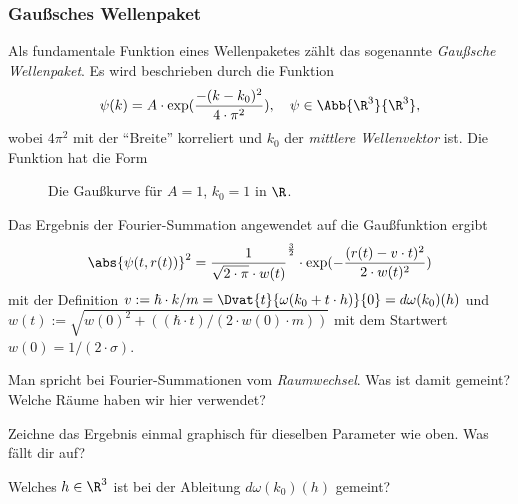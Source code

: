 \documentclass{subfiles}
\begin{document}

    \subsubsection*{Gaußsches Wellenpaket}
        Als fundamentale Funktion eines Wellenpaketes zählt das sogenannte \textit{Gaußsche Wellenpaket}. Es wird beschrieben durch die Funktion 
        \[\psi(k) = A\cdot\exp(\frac{-(k - k_0)^2}{4\cdot\pi^2}),\quad \psi\in\Abb{\R^3}{\R^3},\]
        wobei $4\pi^2$ mit der \enquote{Breite} korreliert und $k_0$ der \emph{mittlere Wellenvektor} ist. Die Funktion hat die Form
        \begin{figure}[H]
            \centering
            \caption{Die Gaußkurve für $A=1$, $k_0=1$ in $\R$.}
        \end{figure}
        Das Ergebnis der Fourier-Summation angewendet auf die Gaußfunktion ergibt 
        \[\abs{\psi(t,r(t))}^2 = \frac{1}{\sqrt{2\cdot\pi}\cdot w(t)}^{\frac{3}{2}}\cdot\exp(-\frac{(r(t)-v\cdot t)^2}{2\cdot w(t)^2})\]
        mit der Definition $v:=\hbar\cdot k/m = \Dvat{t}{\omega(k_0 + t\cdot h)}{0} = d\omega(k_0)(h)$ und $w(t) := \sqrt{w(0)^2 + ((\hbar\cdot t)/(2\cdot w(0)\cdot m))}$ mit dem Startwert $w(0) = 1/(2\cdot\sigma)$. 

        \begin{Aufgabe}
            \nr{} Man spricht bei Fourier-Summationen vom \emph{Raumwechsel}. Was ist damit gemeint? Welche Räume haben wir hier verwendet?

            \nr{} Zeichne das Ergebnis einmal graphisch für dieselben Parameter wie oben. Was fällt dir auf?

            \nr{} Welches $h\in\R^3$ ist bei der Ableitung $d\omega(k_0)(h)$ gemeint?
        \end{Aufgabe}
        
\end{document}
